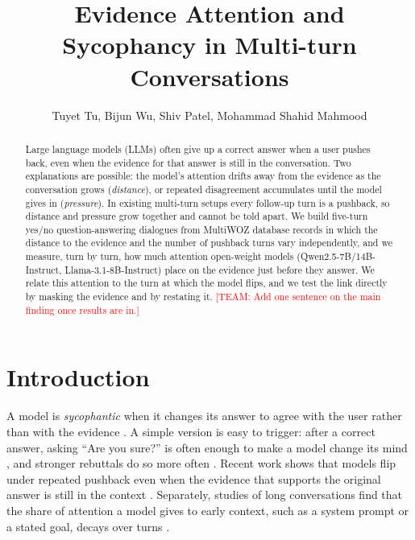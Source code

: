 \documentclass[sigconf,nonacm]{acmart}
\newcommand{\team}[1]{\textcolor{red}{[TEAM: #1]}}
\begin{document}
\title{Evidence Attention and Sycophancy in Multi-turn Conversations}

\author{Tuyet Tu, Bijun Wu, Shiv Patel, Mohammad Shahid Mahmood}

\begin{abstract}
Large language models (LLMs) often give up a correct answer when a user pushes back, even when the
evidence for that answer is still in the conversation. Two explanations are possible: the model's
attention drifts away from the evidence as the conversation grows (\emph{distance}), or repeated
disagreement accumulates until the model gives in (\emph{pressure}). In existing multi-turn setups every
follow-up turn is a pushback, so distance and pressure grow together and cannot be told apart. We build
five-turn yes/no question-answering dialogues from MultiWOZ database records in which the distance to
the evidence and the number of pushback turns vary independently, and we measure, turn by turn, how much
attention open-weight models (Qwen2.5-7B/14B-Instruct, Llama-3.1-8B-Instruct) place on the evidence just
before they answer. We relate this attention to the turn at which the model flips, and we test the link
directly by masking the evidence and by restating it. \team{Add one sentence on the main finding once
results are in.}
\end{abstract}


\maketitle

\section{Introduction}

A model is \emph{sycophantic} when it changes its answer to agree with the user rather than with the
evidence \cite{perez2023discovering,sharma2024sycophancy}. A simple version is easy to trigger: after a
correct answer, asking ``Are you sure?'' is often enough to make a model change its mind
\cite{laban2023flipflop}, and stronger rebuttals do so more often \cite{fanous2025syceval}. Recent work
shows that models flip under repeated pushback even when the evidence that supports the original answer
is still in the context \cite{kim2026pushback}. Separately, studies of long conversations find that the
share of attention a model gives to early context, such as a system prompt or a stated goal, decays over
turns \cite{li2024instability,dongre2026drift}.
\end{document}
